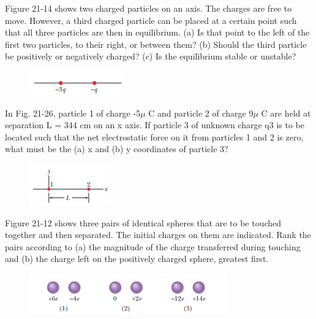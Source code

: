 \documentclass[11pt]{exam}
\begin{document}
\begin{questions}
\addpoints
\question[10] Figure 21-14 shows two charged particles on an axis. The charges are free to move. However, a third charged particle can be placed at a certain point such that all three particles are then in equilibrium. (a) Is that point to the left of the first two particles, to their right, or between them? (b) Should the third particle be positively or negatively charged? (c)  Is the equilibrium stable or unstable?\begin{figure}[H]
\centering
\includegraphics[scale=0.8]{assets/Halliday_ch21q4.png}
\end{figure}
\newpage

\addpoints
\question[10] In Fig. 21-26, particle 1 of charge -5$\mu$ C and particle  2 of charge 9$\mu$ C are held at separation L = 344 cm on an x axis. If particle 3 of unknown charge q3 is to be located such that the net electrostatic force on it from particles 1 and 2 is zero, what must be the (a) x and (b) y coordinates of particle 3?\begin{figure}[H]
\centering
\includegraphics[scale=0.8]{assets/Halliday_ch21p13.png}
\end{figure}
\newpage

\addpoints
\question[10] Figure 21-12 shows three pairs of identical spheres that are to be touched together and then separated. The initial charges on them are indicated. Rank the pairs according to (a) the magnitude of the charge transferred during touching and (b)  the charge left on the positively charged sphere, greatest first.\begin{figure}[H]
\centering
\includegraphics[scale=0.8]{assets/Halliday_ch21q2.png}
\end{figure}
\newpage


\end{questions}
\end{document}
